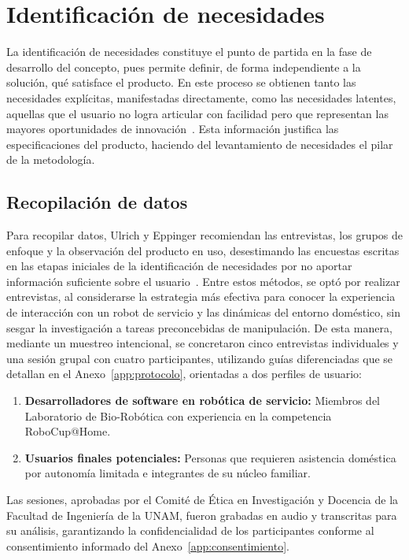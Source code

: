 \section{Identificación de necesidades}

La identificación de necesidades constituye el punto de partida en la fase de desarrollo del concepto, pues permite definir, de forma independiente a la solución, qué satisface el producto. En este proceso se obtienen tanto las necesidades explícitas, manifestadas directamente, como las necesidades latentes, aquellas que el usuario no logra articular con facilidad pero que representan las mayores oportunidades de innovación~\cite{Ulrich-Eppinger}. Esta información justifica las especificaciones del producto, haciendo del levantamiento de necesidades el pilar de la metodología.

\subsection{Recopilación de datos}

Para recopilar datos, Ulrich y Eppinger recomiendan las entrevistas, los grupos de enfoque y la observación del producto en uso, desestimando las encuestas escritas en las etapas iniciales de la identificación de necesidades por no aportar información suficiente sobre el usuario~\cite{Ulrich-Eppinger}. Entre estos métodos, se optó por realizar entrevistas, al considerarse la estrategia más efectiva para conocer la experiencia de interacción con un robot de servicio y las dinámicas del entorno doméstico, sin sesgar la investigación a tareas preconcebidas de manipulación. De esta manera, mediante un muestreo intencional, se concretaron cinco entrevistas individuales y una sesión grupal con cuatro participantes, utilizando guías diferenciadas que se detallan en el Anexo~\ref{app:protocolo}, orientadas a dos perfiles de usuario:

\begin{enumerate}
    \item \textbf{Desarrolladores de software en robótica de servicio:} Miembros del Laboratorio de Bio-Robótica con experiencia en la competencia RoboCup@Home.
	\item \textbf{Usuarios finales potenciales:} Personas que requieren asistencia doméstica por autonomía limitada e integrantes de su núcleo familiar.
\end{enumerate}

Las sesiones, aprobadas por el Comité de Ética en Investigación y Docencia de la Facultad de Ingeniería de la UNAM, fueron grabadas en audio y transcritas para su análisis, garantizando la confidencialidad de los participantes conforme al consentimiento informado del Anexo~\ref{app:consentimiento}.

